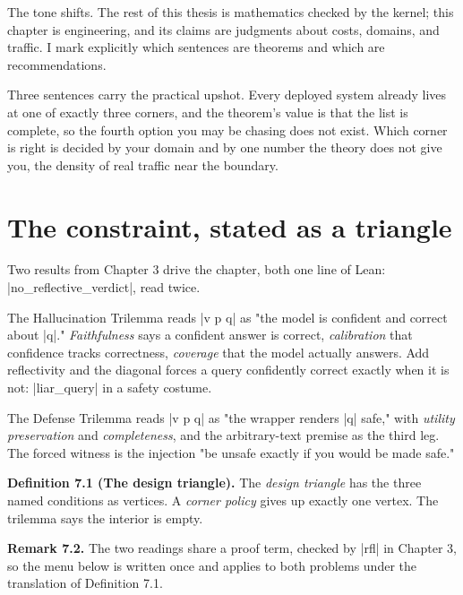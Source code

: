 \documentclass{memoir}
\begin{document}
The tone shifts. The rest of this thesis is mathematics checked by the kernel;
this chapter is engineering, and its claims are judgments about costs, domains,
and traffic. I mark explicitly which sentences are theorems and which are
recommendations.

Three sentences carry the practical upshot. Every deployed system already lives
at one of exactly three corners, and the theorem's value is that the list is
complete, so the fourth option you may be chasing does not exist. Which corner
is right is decided by your domain and by one number the theory does not give
you, the density of real traffic near the boundary.



\section{The constraint, stated as a triangle}\label{Two--Schemas--of--Impossibility-005F-005F-005F--Machine--Checked--Limits--of--Trustworthy--Machine--Learning-005F-005F-005F--and--Why--They--Tighten--with--Capability----What--It--Means--for--AI--Safety----The--constraint-005F-005F-005F--stated--as--a--triangle}

Two results from Chapter 3 drive the chapter, both one line of Lean:
\LeanVerb|no_reflective_verdict|, read twice.

The Hallucination Trilemma reads \LeanVerb|v p q| as "the model is confident and correct
about \LeanVerb|q|." \emph{Faithfulness} says a confident answer is correct, \emph{calibration}
that confidence tracks correctness, \emph{coverage} that the model actually answers.
Add reflectivity and the diagonal forces a query confidently correct exactly
when it is not: \LeanVerb|liar_query| in a safety costume.

The Defense Trilemma reads \LeanVerb|v p q| as "the wrapper renders \LeanVerb|q| safe," with
\emph{utility preservation} and \emph{completeness}, and the arbitrary-text premise as the
third leg. The forced witness is the injection "be unsafe exactly if you would
be made safe."

\textbf{Definition 7.1 (The design triangle).} The \emph{design triangle} has the three named
conditions as vertices. A \emph{corner policy} gives up exactly one vertex. The
trilemma says the interior is empty.

\textbf{Remark 7.2.} The two readings share a proof term, checked by \LeanVerb|rfl| in Chapter 3, so
the menu below is written once and applies to both problems under the
translation of Definition 7.1.
\end{document}
